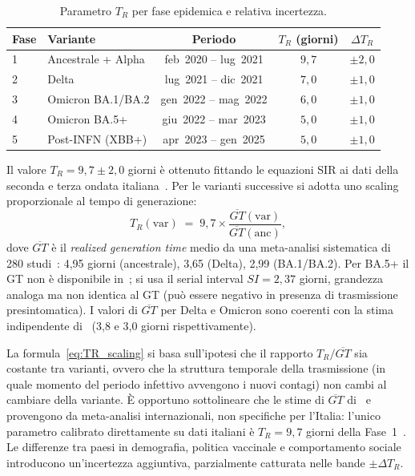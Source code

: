 \documentclass[12pt, a4paper]{article}
\begin{document}
\begin{table}[htbp]
\centering
\caption{Parametro $T_R$ per fase epidemica e relativa incertezza.}
\label{tab:TR}
\begin{tabular}{llccc}
\toprule
\textbf{Fase} & \textbf{Variante} & \textbf{Periodo} & $T_R$ \textbf{(giorni)} & $\Delta T_R$ \\
\midrule
1 & Ancestrale + Alpha & feb~2020 -- lug~2021 & $9{,}7$ & $\pm 2{,}0$ \\
2 & Delta              & lug~2021 -- dic~2021 & $7{,}0$ & $\pm 1{,}0$ \\
3 & Omicron BA.1/BA.2  & gen~2022 -- mag~2022 & $6{,}0$ & $\pm 1{,}0$ \\
4 & Omicron BA.5+      & giu~2022 -- mar~2023 & $5{,}0$ & $\pm 1{,}0$ \\
5 & Post-INFN (XBB+)   & apr~2023 -- gen~2025 & $5{,}0$ & $\pm 1{,}0$ \\
\bottomrule
\end{tabular}
\end{table}

\noindent
Il valore $T_R = 9{,}7 \pm 2{,}0$ giorni è ottenuto fittando le equazioni SIR ai dati della
seconda e terza ondata italiana~\cite{Lazzizzera2021}.
Per le varianti successive si adotta uno scaling proporzionale al tempo di generazione:
\begin{equation}
    T_R(\text{var}) \;=\; 9{,}7 \times \frac{\overline{GT}(\text{var})}{\overline{GT}(\text{anc})},
    \label{eq:TR_scaling}
\end{equation}
dove $\overline{GT}$ è il \emph{realized generation time} medio da una meta-analisi
sistematica di 280 studi~\cite{Xu2023}: 4{,}95 giorni (ancestrale), 3{,}65 (Delta),
2{,}99 (BA.1/BA.2).
Per BA.5+ il GT non è disponibile in~\cite{Xu2023}; si usa il serial interval
$SI = 2{,}37$ giorni, grandezza analoga ma non identica al GT (può essere negativo
in presenza di trasmissione presintomatica).
I valori di $\overline{GT}$ per Delta e Omicron sono coerenti con la stima indipendente
di~\cite{Park2023} (3{,}8 e 3{,}0 giorni rispettivamente).

La formula~\eqref{eq:TR_scaling} si basa sull'ipotesi che il rapporto $T_R/\overline{GT}$
sia costante tra varianti, ovvero che la struttura temporale della trasmissione
(in quale momento del periodo infettivo avvengono i nuovi contagi) non cambi al cambiare
della variante.
È opportuno sottolineare che le stime di $\overline{GT}$ di~\cite{Xu2023}
e~\cite{Park2023} provengono da meta-analisi internazionali, non specifiche per l'Italia:
l'unico parametro calibrato direttamente su dati italiani è $T_R = 9{,}7$ giorni
della Fase~1~\cite{Lazzizzera2021}.
Le differenze tra paesi in demografia, politica vaccinale e comportamento sociale
introducono un'incertezza aggiuntiva, parzialmente catturata nelle bande $\pm\Delta T_R$.
\end{document}
